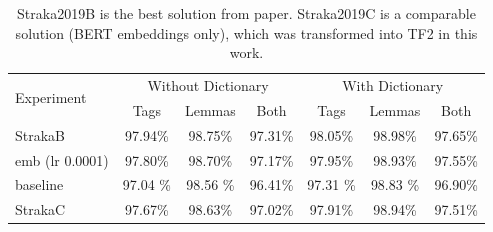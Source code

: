 \begin{table}[!h]
  \begin{tabular}{|l||c|c|c||c|c|c|}
  \hline
\multirow{2}{*}{Experiment} & \multicolumn{3}{c||}{Without Dictionary}  &
      \multicolumn{3}{c|}{With Dictionary} \\ 
    & Tags & Lemmas & Both & Tags & Lemmas & Both \\ \hline
    StrakaB & 97.94\% & 98.75\% & 97.31\% & 98.05\% & 98.98\% & 97.65\% \\ \hline
    emb (lr 0.0001) &  97.80\% & 98.70\% & 97.17\% & 97.95\% & 98.93\% & 97.55\% \\ \hline
    baseline & 97.04 \% & 98.56 \% & 96.41\% &  97.31  \% & 98.83 \% & 96.90\% \\ \hline 
    StrakaC & 97.67\% & 98.63\% & 97.02\% & 97.91\% & 98.94\% & 97.51\% \\ \hline
  \end{tabular}
  \caption{%
  Straka2019B is the best solution from \citep{Straka2019} paper. Straka2019C is a comparable solution  (BERT embeddings only), which was transformed into TF2 in this work.} 
\end{table}



